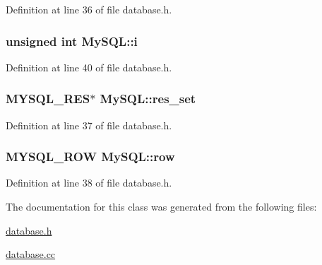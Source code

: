 Definition at line 36 of file database.\-h.

\hypertarget{classMySQL_ad7a1cc7a8e202d4d19468731ed22d74a}{
\subsubsection[{i}]{\setlength{\rightskip}{0pt plus 5cm}unsigned int My\-S\-Q\-L\-::i\hspace{0.3cm}{\ttfamily [protected]}}}\label{classMySQL_ad7a1cc7a8e202d4d19468731ed22d74a}


Definition at line 40 of file database.\-h.

\hypertarget{classMySQL_abfe0a8f3fe7af0a582be5882f0afe69d}{
\subsubsection[{res\-\_\-set}]{\setlength{\rightskip}{0pt plus 5cm}M\-Y\-S\-Q\-L\-\_\-\-R\-E\-S$\ast$ My\-S\-Q\-L\-::res\-\_\-set\hspace{0.3cm}{\ttfamily [protected]}}}\label{classMySQL_abfe0a8f3fe7af0a582be5882f0afe69d}


Definition at line 37 of file database.\-h.

\hypertarget{classMySQL_a56c73e3942ca040f13164e957a41a340}{
\subsubsection[{row}]{\setlength{\rightskip}{0pt plus 5cm}M\-Y\-S\-Q\-L\-\_\-\-R\-O\-W My\-S\-Q\-L\-::row\hspace{0.3cm}{\ttfamily [protected]}}}\label{classMySQL_a56c73e3942ca040f13164e957a41a340}


Definition at line 38 of file database.\-h.



The documentation for this class was generated from the following files\-:\begin{DoxyCompactItemize}
\item 
\hyperlink{database_8h}{database.\-h}\item 
\hyperlink{database_8cc}{database.\-cc}\end{DoxyCompactItemize}
